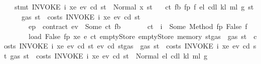 \begin{isabellebody}
\ \ \ {\isachardoublequoteopen}stmt\ {\isacharparenleft}{\kern0pt}INVOKE\ i\ xe{\isacharparenright}{\kern0pt}\ ev\ cd\ st\ {\isacharequal}{\kern0pt}\ Normal\ {\isacharparenleft}{\kern0pt}x{\isacharcomma}{\kern0pt}\ st{\isacharprime}{\kern0pt}{\isacharparenright}{\kern0pt}{\isachardoublequoteclose}\isanewline
\ \ \ ct\ fb\ fp\ f\ e\isactrlsub l\ cd\isactrlsub l\ k\isactrlsub l\ m\isactrlsub l\ g\ st{\isacharprime}{\kern0pt}{\isacharprime}{\kern0pt}\isanewline
\ \ \ \ \ {\isachardoublequoteopen}gas\ st\ {\isachargreater}{\kern0pt}\ costs\ {\isacharparenleft}{\kern0pt}INVOKE\ i\ xe{\isacharparenright}{\kern0pt}\ ev\ cd\ st{\isachardoublequoteclose}\isanewline
\ \ \ \ \ \ \ {\isachardoublequoteopen}ep\ {\isachardollar}{\kern0pt}{\isachardollar}{\kern0pt}\ contract\ ev\ {\isacharequal}{\kern0pt}\ Some\ {\isacharparenleft}{\kern0pt}ct{\isacharcomma}{\kern0pt}\ fb{\isacharparenright}{\kern0pt}{\isachardoublequoteclose}\isanewline
\ \ \ \ \ \ \ {\isachardoublequoteopen}ct\ {\isachardollar}{\kern0pt}{\isachardollar}{\kern0pt}\ i\ {\isacharequal}{\kern0pt}\ Some\ {\isacharparenleft}{\kern0pt}Method\ {\isacharparenleft}{\kern0pt}fp{\isacharcomma}{\kern0pt}\ False{\isacharcomma}{\kern0pt}\ f{\isacharparenright}{\kern0pt}{\isacharparenright}{\kern0pt}{\isachardoublequoteclose}\isanewline
\ \ \ \ \ \ \ {\isachardoublequoteopen}load\ False\ fp\ xe\ {\isacharparenleft}{\kern0pt}e{\isacharprime}{\kern0pt}\ ct{\isacharparenright}{\kern0pt}\ emptyStore\ emptyStore\ {\isacharparenleft}{\kern0pt}memory\ {\isacharparenleft}{\kern0pt}st{\isasymlparr}gas\ {\isacharcolon}{\kern0pt}{\isacharequal}{\kern0pt}\ gas\ st\ {\isacharminus}{\kern0pt}\ costs\ {\isacharparenleft}{\kern0pt}INVOKE\ i\ xe{\isacharparenright}{\kern0pt}\ ev\ cd\ st{\isasymrparr}{\isacharparenright}{\kern0pt}{\isacharparenright}{\kern0pt}\ ev\ cd\ {\isacharparenleft}{\kern0pt}st{\isasymlparr}gas\ {\isacharcolon}{\kern0pt}{\isacharequal}{\kern0pt}\ gas\ st\ {\isacharminus}{\kern0pt}\ costs\ {\isacharparenleft}{\kern0pt}INVOKE\ i\ xe{\isacharparenright}{\kern0pt}\ ev\ cd\ st{\isasymrparr}{\isacharparenright}{\kern0pt}\ {\isacharparenleft}{\kern0pt}gas\ st\ {\isacharminus}{\kern0pt}\ costs\ {\isacharparenleft}{\kern0pt}INVOKE\ i\ xe{\isacharparenright}{\kern0pt}\ ev\ cd\ st{\isacharparenright}{\kern0pt}\ {\isacharequal}{\kern0pt}\ Normal\ {\isacharparenleft}{\kern0pt}{\isacharparenleft}{\kern0pt}e\isactrlsub l{\isacharcomma}{\kern0pt}\ cd\isactrlsub l{\isacharcomma}{\kern0pt}\ k\isactrlsub l{\isacharcomma}{\kern0pt}\ m\isactrlsub l{\isacharparenright}{\kern0pt}{\isacharcomma}{\kern0pt}\ g{\isacharparenright}{\kern0pt}{\isachardoublequoteclose}\isanewline

\end{isabellebody}
